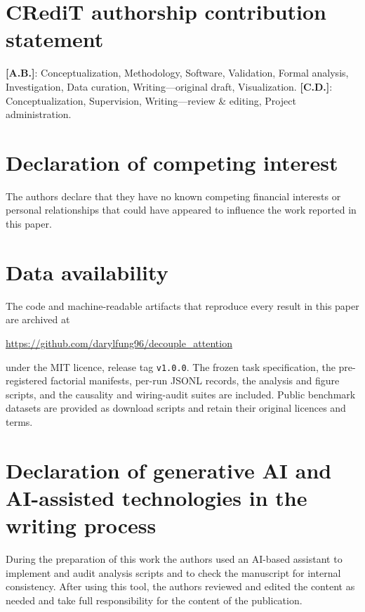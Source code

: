 \documentclass{article}
\begin{document}
\section*{CRediT authorship contribution statement}
\textbf{[A.B.]}: Conceptualization, Methodology, Software, Validation, Formal
analysis, Investigation, Data curation, Writing---original draft, Visualization.
\textbf{[C.D.]}: Conceptualization, Supervision, Writing---review \& editing,
Project administration.

\section*{Declaration of competing interest}
The authors declare that they have no known competing financial interests or
personal relationships that could have appeared to influence the work reported
in this paper.

\section*{Data availability}
The code and machine-readable artifacts that reproduce every result in this
paper are archived at
\begin{center}\url{https://github.com/darylfung96/decouple_attention}\end{center}
under the MIT licence, release tag \texttt{v1.0.0}. The frozen task specification,
the pre-registered factorial manifests, per-run JSONL records, the analysis and
figure scripts, and the causality and wiring-audit suites are included. Public
benchmark datasets are provided as download scripts and retain their original
licences and terms.

\section*{Declaration of generative AI and AI-assisted technologies in the writing process}
During the preparation of this work the authors used an AI-based assistant to
implement and audit analysis scripts and to check the manuscript for internal
consistency. After using this tool, the authors reviewed and edited the content
as needed and take full responsibility for the content of the publication.


\setlength{\bibsep}{6pt}


\newpage
\appendix

\end{document}
